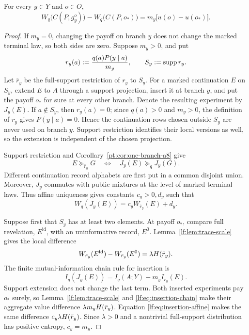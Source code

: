 \begin{lemma}\label{lf:lem:branch-increment}
For every $y\in Y$ and $o\in O$,
\begin{equation}
W_q\bigl(C(P,g_y^o)\bigr)
-W_q\bigl(C(P,o_\ast)\bigr)=m_y\bigl[u(o)-u(o_\ast)\bigr].
\label{lf:eq:branch-increment}
\end{equation}
\end{lemma}

\begin{proof}
If $m_y=0$, changing the payoff on branch $y$ does not change the marked
terminal law, so both sides are zero.  Suppose $m_y>0$, and put
\[
r_y(a):=\frac{q(a)P(y\mid a)}{m_y},
\qquad
S_y:=\operatorname{supp} r_y.
\]
Let $\bar r_y$ be the full-support restriction of $r_y$ to $S_y$.  For a
marked continuation $E$ on $S_y$, extend $E$ to $A$ through a support
projection, insert it at branch $y$, and put the payoff $o_\ast$ for sure at
every other branch.  Denote the resulting experiment by $J_y(E)$.  If
$a\notin S_y$, then $r_y(a)=0$; since $q(a)>0$ and $m_y>0$, the definition of
$r_y$ gives $P(y\mid a)=0$.  Hence the continuation rows chosen outside $S_y$
are never used on branch $y$.  Support restriction identifies their local
versions as well, so the extension is independent of the chosen projection.

Support restriction and Corollary~\ref{pt:cor:one-branch-a8} give
\[
E\succeq_{\bar r_y}G
\quad\Longleftrightarrow\quad
J_y(E)\succeq_q J_y(G).
\]
Different continuation record alphabets are first put in a common disjoint union.  Moreover, $J_y$ commutes
with public mixtures at the level of marked terminal laws.  Thus affine
uniqueness gives constants $c_y>0,d_y$ such that
\begin{equation}
W_q(J_y(E))=c_y W_{\bar r_y}(E)+d_y.
\label{lf:eq:insertion-affine}
\end{equation}

Suppose first that $S_y$ has at least two elements.  At payoff $o_\ast$, compare
full revelation, $E^{\mathrm{id}}$, with an uninformative record, $E^0$.
Lemma~\ref{lf:lem:trace-scale} gives the local difference
\[
W_{\bar r_y}(E^{\mathrm{id}})-W_{\bar r_y}(E^0)
=\lambda H(\bar r_y).
\]
The finite mutual-information chain rule for insertion is
\begin{equation}
I_q(J_y(E))=I_q(A;Y)+m_y I_{\bar r_y}(E).
\label{lf:eq:insertion-chain}
\end{equation}
Support extension does not change the last term.  Both inserted experiments
pay $o_\ast$ surely, so Lemma~\ref{lf:lem:trace-scale} and
\eqref{lf:eq:insertion-chain} make their aggregate value difference
$\lambda m_yH(\bar r_y)$.  Equation
\eqref{lf:eq:insertion-affine} makes the same difference
$c_y\lambda H(\bar r_y)$.  Since $\lambda>0$ and a nontrivial full-support
distribution has positive entropy, $c_y=m_y$.


\end{proof}
